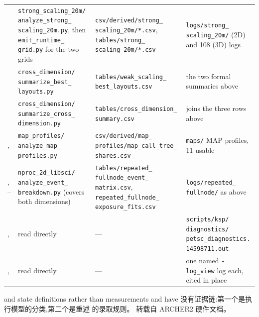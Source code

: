 \documentclass[11pt,a4paper,oneside]{report}
\begin{document}
\begin{table}[htbp]
\begin{tabular}{L{0.155\textwidth} L{0.215\textwidth} L{0.245\textwidth} L{0.235\textwidth}}
      & \texttt{strong\_scaling\_20m/ analyze\_strong\_ scaling\_20m.py}, \newline then \texttt{emit\_runtime\_ grid.py} for the two grids
      & \texttt{csv/derived/strong\_ scaling\_20m/*.csv}, \texttt{tables/strong\_ scaling\_20m/*.csv}
      & \texttt{logs/strong\_ scaling\_20m/}  (2D) and 108 (3D) logs \\
    \addlinespace
      & \texttt{cross\_dimension/ summarize\_best\_ layouts.py}
      & \texttt{tables/weak\_scaling\_ best\_layouts.csv}
      & the two formal summaries above \\
    \addlinespace
      & \texttt{cross\_dimension/ summarize\_cross\_ dimension.py}
      & \texttt{tables/cross\_dimension\_ summary.csv}
      & joins the three rows above \\
    \addlinespace
    , 
      & \texttt{map\_profiles/ analyze\_map\_ profiles.py}
      & \texttt{csv/derived/map\_ profiles/map\_call\_tree\_ shares.csv}
      & \texttt{maps/}  MAP profiles, 11 usable \\
    \addlinespace
    , --
      & \texttt{nproc\_2d\_libsci/ analyze\_event\_ breakdown.py} \newline (covers both dimensions)
      & \texttt{tables/repeated\_ fullnode\_event\_ matrix.csv}, \texttt{repeated\_fullnode\_ exposure\_fits.csv}
      & \texttt{logs/repeated\_ fullnode/} \newline as above \\
    \addlinespace
    , 
      & read directly
      & ---
      & \texttt{scripts/ksp/ diagnostics/ petsc\_diagnostics. 14598711.out} \\
    \addlinespace
    , 
      & read directly
      & ---
      & one named \texttt{-log\_view} log each, cited in place \\
    \bottomrule
  \end{tabular}
\end{table}

 and  state definitions rather than measurements and have
没有证据链:第一个是执行模型的分类,第二个是重述
的录取规则。
 转载自 ARCHER2 硬件文档。
\end{document}
